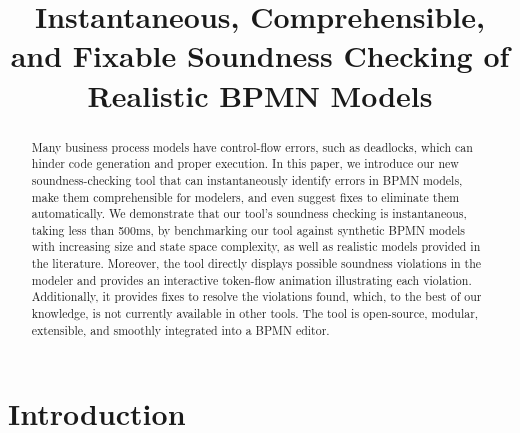 \documentclass[runningheads]{llncs}
\begin{document}
%
\title{Instantaneous, Comprehensible, and Fixable Soundness Checking of Realistic BPMN Models}
%
%
\maketitle              %
%
\begin{abstract}
	
Many business process models have control-flow errors, such as deadlocks, which can hinder code generation and proper execution.
In this paper, we introduce our new soundness-checking tool that can instantaneously identify errors in BPMN models, make them comprehensible for modelers, and even suggest fixes to eliminate them automatically.
We demonstrate that our tool's soundness checking is instantaneous, taking less than 500ms, by benchmarking our tool against synthetic BPMN models with increasing size and state space complexity, as well as realistic models provided in the literature.
Moreover, the tool directly displays possible soundness violations in the modeler and provides an interactive token-flow animation illustrating each violation.
Additionally, it provides fixes to resolve the violations found, which, to the best of our knowledge, is not currently available in other tools.
The tool is open-source, modular, extensible, and smoothly integrated into a BPMN editor.

\end{abstract}


\renewcommand{\labelenumi}{(\textbf{\arabic{enumi})}}

\section{Introduction} \label{sec:introduction}
\end{document}
